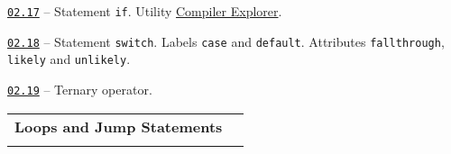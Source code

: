 \documentclass[a4paper,12pt]{article}
\renewenvironment{itemize}
{
    \begin{list}{\labelitemi}
    {
      \setlength{\topsep}{0pt}
      \setlength{\partopsep}{0pt}
      \setlength{\parskip}{0pt}
      \setlength{\itemsep}{0pt}
      \setlength{\parsep}{0pt}
      \setlength{\leftmargin}{14.5pt}
    }
}{\end{list}}
\begin{document}
\medskip\smallskip

\begin{itemize}

    \item \href{https://github.com/i-s-m-mipt/Education/blob/master/projects/examples/source/02.17.cpp}{\texttt{02.17}} -- Statement \lstinline{if}. Utility \href{https://godbolt.org/}{Compiler Explorer}.

    \smallskip

    \item \href{https://github.com/i-s-m-mipt/Education/blob/master/projects/examples/source/02.18.cpp}{\texttt{02.18}} -- Statement \lstinline{switch}. Labels \lstinline{case} and \lstinline{default}. Attributes \lstinline{fallthrough}, \lstinline{likely} and \lstinline{unlikely}.

    \smallskip

    \item \href{https://github.com/i-s-m-mipt/Education/blob/master/projects/examples/source/02.19.cpp}{\texttt{02.19}} -- Ternary operator.

\end{itemize}

\bigskip\medskip

\begin{tabular}{!{\vrule width 1pt}L{5.7cm}!{\vrule width 1pt}L{13.3cm}!{\vrule width 0pt}} 


\textbf{Loops and Jump Statements} & \\


\end{tabular}

\medskip\smallskip
\end{document}
